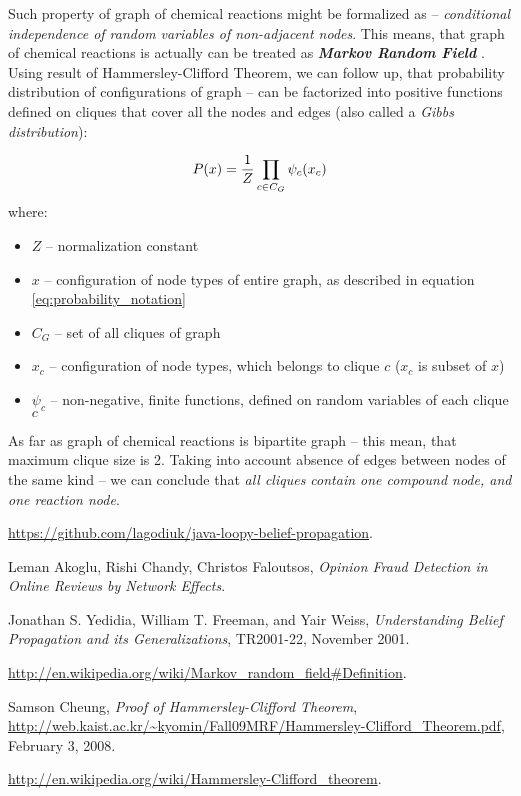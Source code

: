 \documentclass[10pt]{article}
\begin{document}
\noindent Such property of graph of chemical reactions might be formalized as -- \emph{conditional independence of random variables of non-adjacent nodes}. This means, that graph of chemical reactions is actually can be treated as \emph{\textbf{Markov Random Field}} \cite{wikipedia_mrf}.
\\

Using result of Hammersley-Clifford Theorem, we can follow up, that probability distribution of configurations of graph -- can be factorized into positive functions defined on cliques that cover all the nodes and edges (also called a \emph{Gibbs distribution})\cite{hammersley_clifford_proof, wikipedia_hammersley_clifford}:

\begin{equation}
P(x) = {1 \over Z} \prod_{c \in C_G} \psi_{c}(x_c)
\end{equation}
where:
\begin{itemize} 
    \setlength \itemsep{0em}
    \item $Z$ -- normalization constant
    \item $x$ -- configuration of node types of entire graph, as described in equation \eqref{eq:probability_notation}
    \item $C_G$ -- set of all cliques of graph
    \item $x_c$ -- configuration of node types, which belongs to clique $c$ ($x_c$ is subset of $x$)
    \item $\psi_{c}$ -- non-negative, finite functions, defined on random variables of each clique $c$
\end{itemize}

\noindent As far as graph of chemical reactions is bipartite graph -- this mean, that maximum clique size is 2. Taking into account absence of edges between nodes of the same kind -- we can conclude that \emph{all cliques contain one compound node, and one reaction node}.

\newpage

\begin{thebibliography}{9}

  \url{https://github.com/lagodiuk/java-loopy-belief-propagation}.

  Leman Akoglu, Rishi Chandy, Christos Faloutsos,
  \emph{Opinion Fraud Detection in Online Reviews by Network Effects}.

  Jonathan S. Yedidia, William T. Freeman, and Yair Weiss,
  \emph{Understanding Belief Propagation and its Generalizations},
  TR2001-22, 
  November 2001.
  
  \url{http://en.wikipedia.org/wiki/Markov_random_field#Definition}.
  
  Samson Cheung,
  \emph{Proof of Hammersley-Clifford Theorem},
  \url{http://web.kaist.ac.kr/~kyomin/Fall09MRF/Hammersley-Clifford_Theorem.pdf},
  February 3, 2008.

  \url{http://en.wikipedia.org/wiki/Hammersley-Clifford_theorem}.

\end{thebibliography}
\end{document}
